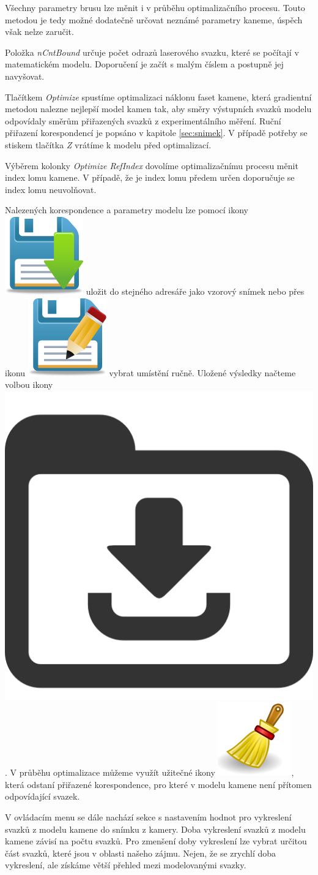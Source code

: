 Všechny parametry brusu lze měnit i v průběhu optimalizačního procesu. Touto metodou je tedy možné dodatečně určovat neznámé parametry kaneme, úspěch však nelze zaručit. 

Položka \textit{nCntBound} určuje počet odrazů laserového svazku, které se počítají v matematickém modelu. Doporučení je začít s malým číslem a postupně jej navyšovat. %

Tlačítkem \textit{Optimize} spustíme optimalizaci náklonu faset kamene, která gradientní metodou nalezne nejlepší model kamen tak, aby směry výstupních svazků modelu odpovídaly směrům přiřazených svazků z experimentálního měření. Ruční přiřazení korespondencí je popsáno v kapitole \ref{sec:snimek}. V případě potřeby se stiskem tlačítka \textit{Z} vrátíme k modelu před optimalizací.  

Výběrem kolonky \textit{Optimize RefIndex} dovolíme optimalizačnímu procesu měnit index lomu kamene. V případě, že je index lomu předem určen doporučuje se index lomu neuvolňovat.

Nalezených korespondence a parametry modelu lze pomocí ikony \includegraphics[width = .35cm]{icons/save-icon.png} uložit do stejného adresáře jako vzorový snímek nebo přes ikonu \includegraphics[width = .35cm]{icons/save-as-icon.png} vybrat umístění ručně. Uložené výsledky načteme volbou ikony \includegraphics[width = .35cm]{icons/load-icon.png}. V průběhu optimalizace můžeme využít užitečné ikony \includegraphics[width = .35cm]{icons/clear-icon.png}, která odstaní přiřazené korespondence, pro které v modelu kamene není přítomen odpovídající svazek.  

V ovládacím menu se dále nachází sekce s nastavením hodnot pro vykreslení svazků z modelu kamene do snímku z kamery. Doba vykreslení svazků z modelu kamene závisí na počtu svazků. Pro zmenšení doby vykreslení lze vybrat určitou část svazků, které jsou v oblasti našeho zájmu. Nejen, že se zrychlí doba vykreslení, ale získáme větší přehled mezi modelovanými svazky. 

